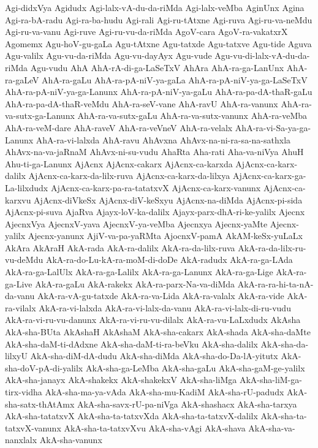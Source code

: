 {Agi-didxVya
Agidudx
Agi-lalx-vA-du-da-riMda
Agi-lalx-veMba
AginUnx
Agina
Agi-ra-bA-radu
Agi-ra-ba-hudu
Agi-rali
Agi-ru-tAtxne
Agi-ruva
Agi-ru-va-neMdu
Agi-ru-va-vanu
Agi-ruve
Agi-ru-vu-da-riMda
AgoV-cara
AgoV-ra-vakatxrX
Agomemx
Agu-hoV-gu-gaLa
Agu-tAtxne
Agu-tatxde
Agu-tatxve
Agu-tide
Aguva
Agu-valilx
Agu-vu-da-riMda
Agu-vu-dayAyx
Agu-vude
Agu-vu-di-lalx-vA-du-da-riMda
Agu-vudu
AhA
AhA-rA-di-ga-LaSeTxV
AhAra
AhA-ra-ga-LanUnx
AhA-ra-gaLeV
AhA-ra-gaLu
AhA-ra-pA-niV-ya-gaLa
AhA-ra-pA-niV-ya-ga-LaSeTxV
AhA-ra-pA-niV-ya-ga-Lanunx
AhA-ra-pA-niV-ya-gaLu
AhA-ra-pa-dA-thaR-gaLu
AhA-ra-pa-dA-thaR-veMdu
AhA-ra-seV-vane
AhA-ravU
AhA-ra-vanunx
AhA-ra-va-sutx-ga-Lanunx
AhA-ra-va-sutx-gaLu
AhA-ra-va-sutx-vanunx
AhA-ra-veMba
AhA-ra-veM-dare
AhA-raveV
AhA-ra-veVneV
AhA-ra-velalx
AhA-ra-vi-Sa-ya-ga-Lanunx
AhA-ra-vi-lalxda
AhA-ravu
AhAvxna
AhAvx-na-ni-ra-sa-na-sathxla
AhAvx-na-va-jaRnaM
AhAvx-ni-su-vudu
AhaRta
Aha-rati
Aha-va-niVya
AhuH
Ahu-ti-ga-Lanunx
AjAcnx
AjAcnx-cakarx
AjAcnx-ca-karxda
AjAcnx-ca-karx-dalilx
AjAcnx-ca-karx-da-lilx-ruva
AjAcnx-ca-karx-da-lilxya
AjAcnx-ca-karx-ga-La-lilxdudx
AjAcnx-ca-karx-pa-ra-tatatxvX
AjAcnx-ca-karx-vanunx
AjAcnx-ca-karxvu
AjAcnx-diVkeSx
AjAcnx-diV-keSxyu
AjAcnx-na-diMda
AjAcnx-pi-sida
AjAcnx-pi-suva
AjaRva
Ajayx-loV-ka-dalilx
Ajayx-parx-dhA-ri-ke-yalilx
Ajecnx
AjecnxVya
AjecnxV-yava
AjecnxV-ya-veMba
Ajecnxya
Ajecnx-yaMte
Ajecnx-yalilx
Ajecnx-yanunx
AjiV-va-pa-yaRMta
AjocnxV-pamA
AkAM-keSx-yuLaLx
AkAra
AkAraH
AkA-rada
AkA-ra-dalilx
AkA-ra-da-lilx-ruva
AkA-ra-da-lilx-ru-vu-deMdu
AkA-ra-do-Lu-kA-ra-moM-di-doDe
AkA-radudx
AkA-ra-ga-LAda
AkA-ra-ga-LalUlx
AkA-ra-ga-Lalilx
AkA-ra-ga-Lanunx
AkA-ra-ga-Lige
AkA-ra-ga-Live
AkA-ra-gaLu
AkA-rakekx
AkA-ra-parx-Na-va-diMda
AkA-ra-ra-hi-ta-nA-da-vanu
AkA-ra-vA-gu-tatxde
AkA-ra-va-Lida
AkA-ra-valalx
AkA-ra-vide
AkA-ra-vilalx
AkA-ra-vi-lalxda
AkA-ra-vi-lalx-da-vanu
AkA-ra-vi-lalx-di-ru-vudu
AkA-ra-vi-ru-vu-danunx
AkA-ra-vi-ru-vu-dilalx
AkA-ra-vu-LaLxdudx
AkAsha
AkA-sha-BUta
AkAshaH
AkAshaM
AkA-sha-cakarx
AkA-shada
AkA-sha-daMte
AkA-sha-daM-ti-dAdxne
AkA-sha-daM-ti-ra-beVku
AkA-sha-dalilx
AkA-sha-da-lilxyU
AkA-sha-diM-dA-dudu
AkA-sha-diMda
AkA-sha-do-Da-lA-yitutx
AkA-sha-doV-pA-di-yalilx
AkA-sha-ga-LeMba
AkA-sha-gaLu
AkA-sha-gaM-ge-yalilx
AkA-sha-janayx
AkA-shakekx
AkA-shakekxV
AkA-sha-liMga
AkA-sha-liM-ga-tirx-vidha
AkA-sha-ma-ya-vAda
AkA-sha-mu-KadiM
AkA-sha-rU-padudx
AkA-sha-satx-thAtAmx
AkA-sha-savx-rU-pa-niVga
AkA-shashacx
AkA-sha-tarxya
AkA-sha-tatatxvX
AkA-sha-ta-tatxvXda
AkA-sha-ta-tatxvX-dalilx
AkA-sha-ta-tatxvX-vanunx
AkA-sha-ta-tatxvXvu
AkA-sha-vAgi
AkA-shava
AkA-sha-va-nanxlalx
AkA-sha-vanunx
}
